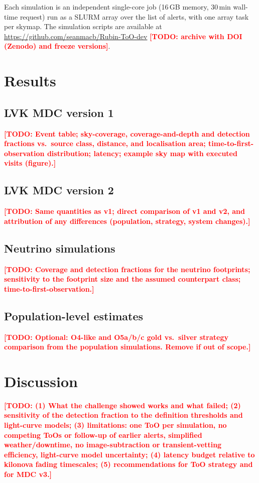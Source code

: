 \documentclass[OPS,lsstdraft,authoryear,toc]{lsstdoc}
\newcommand{\todo}[1]{\textcolor{red}{\textbf{[TODO: #1]}}}
\begin{document}
Each simulation is an independent single-core job (16\,GB memory, 30\,min wall-time request) run as a SLURM
array over the list of alerts, with one array task per skymap. The simulation scripts are available at
\url{https://github.com/seanmacb/Rubin-ToO-dev} \todo{archive with DOI (Zenodo) and freeze versions}.

\section{Results}\label{sec:results}

\subsection{LVK MDC version 1}\label{sec:res_v1}
\todo{Event table; sky-coverage, coverage-and-depth and detection fractions vs.\ source class, distance, and localisation area; time-to-first-observation distribution; latency; example sky map with executed visits (figure).}

\subsection{LVK MDC version 2}\label{sec:res_v2}
\todo{Same quantities as v1; direct comparison of v1 and v2, and attribution of any differences (population, strategy, system changes).}

\subsection{Neutrino simulations}\label{sec:res_nu}
\todo{Coverage and detection fractions for the neutrino footprints; sensitivity to the footprint size and the assumed counterpart class; time-to-first-observation.}

\subsection{Population-level estimates}\label{sec:res_pop}
\todo{Optional: O4-like and O5a/b/c gold vs.\ silver strategy comparison from the population simulations. Remove if out of scope.}

\section{Discussion}\label{sec:discussion}
\todo{(1) What the challenge showed works and what failed; (2) sensitivity of the detection fraction to the definition thresholds and light-curve models; (3) limitations: one ToO per simulation, no competing ToOs or follow-up of earlier alerts, simplified weather/downtime, no image-subtraction or transient-vetting efficiency, light-curve model uncertainty; (4) latency budget relative to kilonova fading timescales; (5) recommendations for ToO strategy and for MDC v3.}
\end{document}
